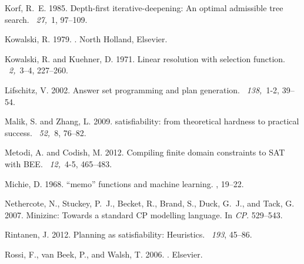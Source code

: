 \documentclass{new_tlp}
\begin{document}
\begin{thebibliography}{}
{\sc Korf, R.~E.} 1985.
\newblock Depth-first iterative-deepening: An optimal admissible tree search.
~{\em 27,\/}~1, 97--109.

{\sc Kowalski, R.} 1979.
.
\newblock North Holland, Elsevier.

{\sc Kowalski, R.} {\sc and} {\sc Kuehner, D.} 1971.
\newblock Linear resolution with selection function.
~{\em 2,\/}~3--4, 227--260.

{\sc Lifschitz, V.} 2002.
\newblock Answer set programming and plan generation.
~{\em 138,\/}~1-2, 39--54.

{\sc Malik, S.} {\sc and} {\sc Zhang, L.} 2009.
 satisfiability: from theoretical hardness to practical
  success.
~{\em 52,\/}~8, 76--82.

{\sc Metodi, A.} {\sc and} {\sc Codish, M.} 2012.
\newblock Compiling finite domain constraints to {SAT} with {BEE}.
~{\em 12,\/}~4-5, 465--483.

{\sc Michie, D.} 1968.
\newblock ``memo'' functions and machine learning.
, 19--22.

{\sc Nethercote, N.}, {\sc Stuckey, P.~J.}, {\sc Becket, R.}, {\sc Brand, S.},
  {\sc Duck, G.~J.}, {\sc and} {\sc Tack, G.} 2007.
\newblock Minizinc: Towards a standard {CP} modelling language.
\newblock In {\em CP}. 529--543.

{\sc Rintanen, J.} 2012.
\newblock Planning as satisfiability: Heuristics.
~{\em 193}, 45--86.

{\sc Rossi, F.}, {\sc van Beek, P.}, {\sc and} {\sc Walsh, T.} 2006.
.
\newblock Elsevier.


\end{thebibliography}
\end{document}

